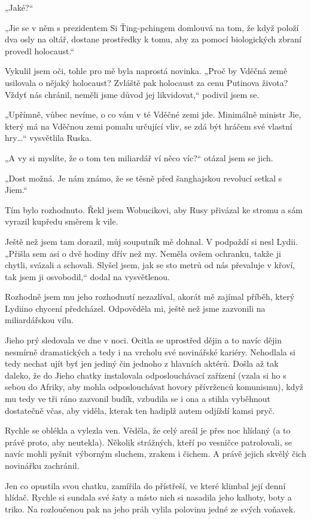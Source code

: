 „Jaké?“

„Jie se v něm s prezidentem Si Ťing-pchingem domlouvá na tom, že když položí dva osly na oltář, dostane prostředky k tomu, aby za pomocí biologických zbraní provedl holocaust.“

Vykulil jsem oči, tohle pro mě byla naprostá novinka. „Proč by Vděčná země usilovala o nějaký holocaust? Zvláště pak holocaust za cenu Putinova života? Vždyť nás chránil, neměli jsme důvod jej likvidovat,“ podivil jsem se.

„Upřímně, vůbec nevíme, o co vám v té Vděčné zemi jde. Minimálně ministr Jie, který má na Vděčnou zemi pomalu určující vliv, se zdá být hráčem své vlastní hry…“ vysvětlila Ruska.

„A vy si myslíte, že o tom ten miliardář ví něco víc?“ otázal jsem se jich.

„Dost možná. Je nám známo, že se těsně před šanghajskou revolucí setkal s Jiem.“

Tím bylo rozhodnuto. Řekl jsem Wobucikovi, aby Rusy přivázal ke stromu a sám vyrazil kupředu směrem k vile.

Ještě než jsem tam dorazil, můj souputník mě dohnal. V podpaždí si nesl Lydii. „Přišla sem asi o dvě hodiny dřív než my. Neměla ovšem ochranku, takže ji chytli, svázali a schovali. Slyšel jsem, jak se sto metrů od nás převaluje v křoví, tak jsem ji osvobodil,“ dodal na vysvětlenou.

Rozhodně jsem mu jeho rozhodnutí nezazlíval, akorát mě zajímal příběh, který Lydiino chycení předcházel. Odpověděla mi, ještě než jsme zazvonili na miliardářskou vilu. 

Jieho prý sledovala ve dne v noci. Ocitla se uprostřed dějin a to navíc dějin nesmírně dramatických a tedy i na vrcholu své novinářské kariéry. Nehodlala si tedy nechat ujít byť jen jediný čin jednoho z hlavních aktérů. Došla až tak daleko, že do Jieho chatky instalovala odposlouchávací zařízení (vzala si ho s sebou do Afriky, aby mohla odposlouchávat hovory přívrženců komunismu), když mu tedy ve tři ráno zazvonil budík, vzbudila se i ona a stihla vyběhnout dostatečně včas, aby viděla, kterak ten hadiplž autem odjíždí kamsi pryč.  

Rychle se oblékla a vylezla ven. Věděla, že celý areál je přes noc hlídaný (a to právě proto, aby neutekla). Několik strážných, kteří po vesničce patrolovali, se navíc mohli pyšnit výborným sluchem, zrakem i čichem. A právě jejich skvělý čich novinářku zachránil.

Jen co opustila svou chatku, zamířila do přístřeší, ve které klimbal její denní hlídač. Rychle si sundala své šaty a místo nich si nasadila jeho kalhoty, boty a triko. Na rozloučenou pak na jeho práh vylila polovinu jedné ze svých voňavek.

